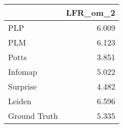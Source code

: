 \begin{tabular}{lr}
\toprule
{} & LFR_om_2 \\
\midrule
PLP          &    6.009 \\
PLM          &    6.123 \\
Potts        &    3.851 \\
Infomap      &    5.022 \\
Surprise     &    4.482 \\
Leiden       &    6.596 \\
Ground Truth &    5.335 \\
\bottomrule
\end{tabular}
